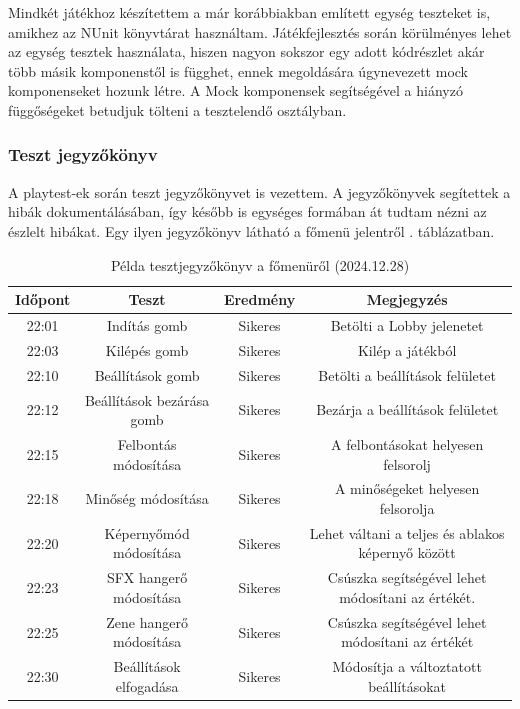 \documentclass[]{thesis-ekf}
\theoremstyle{definition}
\theoremstyle{remark}
\begin{document}
Mindkét játékhoz készítettem a már korábbiakban említett egység teszteket is, amikhez az NUnit könyvtárat használtam. Játékfejlesztés során körülményes lehet az egység tesztek használata, hiszen nagyon sokszor egy adott kódrészlet akár több másik komponenstől is függhet, ennek megoldására úgynevezett mock komponenseket hozunk létre. A Mock komponensek segítségével a hiányzó függőségeket betudjuk tölteni a tesztelendő osztályban. \cite{NUnit}

\subsubsection{Teszt jegyzőkönyv}

A playtest-ek során teszt jegyzőkönyvet is vezettem. A jegyzőkönyvek segítettek a hibák dokumentálásában, így később is egységes formában át tudtam nézni az észlelt hibákat. Egy ilyen jegyzőkönyv látható a főmenü jelentről . táblázatban.

\begin{table}[ht!]
	\centering
	\footnotesize
	\begin{tabular}{|c|c|c|c|}
		\hline
		\textbf{Időpont} & \textbf{Teszt} & \textbf{Eredmény} & \textbf{Megjegyzés} \\
		\hline
		22:01 & Indítás gomb & Sikeres & Betölti a Lobby jelenetet \\
        \hline
		22:03 & Kilépés gomb & Sikeres & Kilép a játékból \\
		\hline
		22:10 & Beállítások gomb & Sikeres & Betölti a beállítások felületet \\
		\hline
		22:12 & Beállítások bezárása gomb & Sikeres & Bezárja a beállítások felületet \\
		\hline
		22:15 & Felbontás módosítása & Sikeres & A felbontásokat helyesen felsorolj \\
		\hline
		22:18 & Minőség módosítása & Sikeres & A minőségeket helyesen felsorolja \\
		\hline
		22:20 & Képernyőmód módosítása & Sikeres & Lehet váltani a teljes és ablakos képernyő között \\
		\hline
		22:23 & SFX hangerő módosítása & Sikeres & Csúszka segítségével lehet módosítani az értékét. \\
		\hline
		22:25 & Zene hangerő módosítása & Sikeres & Csúszka segítségével lehet módosítani az értékét \\
		\hline
		22:30 & Beállítások elfogadása & Sikeres & Módosítja a változtatott beállításokat \\
		\hline
	\end{tabular}
	\caption{Példa tesztjegyzőkönyv a főmenüről (2024.12.28)}
	\label{tab-tesztjegyzokonyv}
\end{table}
\end{document}
